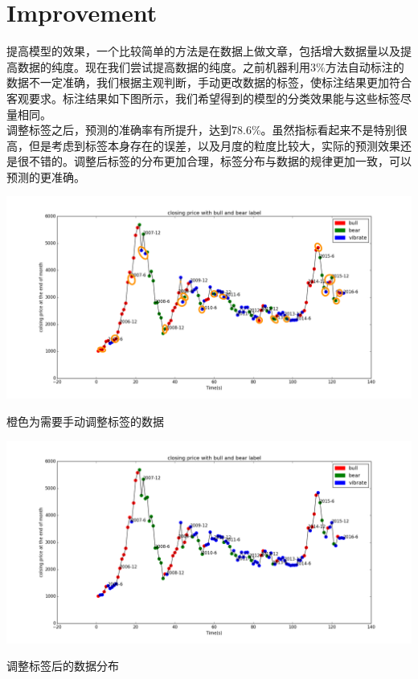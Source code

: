 \documentclass[10pt,a4paper]{article}
\begin{document}
\section{Improvement }
提高模型的效果，一个比较简单的方法是在数据上做文章，包括增大数据量以及提高数据的纯度。现在我们尝试提高数据的纯度。之前机器利用3\%方法自动标注的数据不一定准确，我们根据主观判断，手动更改数据的标签，使标注结果更加符合客观要求。标注结果如下图所示，我们希望得到的模型的分类效果能与这些标签尽量相同。\\
调整标签之后，预测的准确率有所提升，达到78.6\%。虽然指标看起来不是特别很高，但是考虑到标签本身存在的误差，以及月度的粒度比较大，实际的预测效果还是很不错的。调整后标签的分布更加合理，标签分布与数据的规律更加一致，可以预测的更准确。
\begin{center}
	\includegraphics[width=1\textwidth]{需要调整的标签.png}
	\caption{橙色为需要手动调整标签的数据}
\end{center}
\begin{center}
	\includegraphics[width=1\textwidth]{调整后的标签.png}
	\caption{调整标签后的数据分布}
\end{center}
\end{document}
